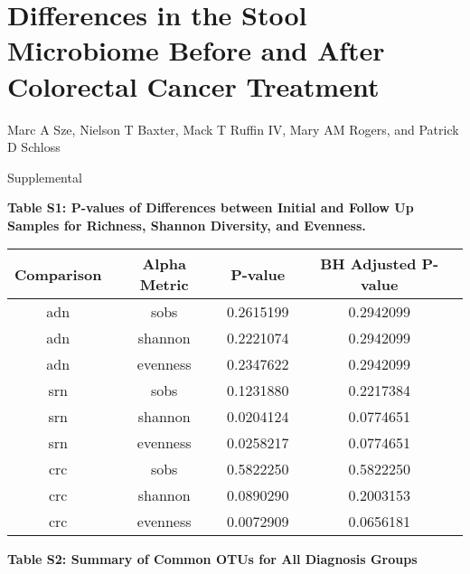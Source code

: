 \documentclass[12pt,]{article}
\title{}
\author{}
\date{}
\begin{document}
\section{Differences in the Stool Microbiome Before and After Colorectal
Cancer
Treatment}\label{differences-in-the-stool-microbiome-before-and-after-colorectal-cancer-treatment}

\vspace{10mm}

\begin{center}
Marc A Sze, Nielson T Baxter, Mack T Ruffin IV, Mary AM Rogers, and Patrick D Schloss

\vspace{10mm}

Supplemental
\end{center}

\newpage

\textbf{Table S1: P-values of Differences between Initial and Follow Up
Samples for Richness, Shannon Diversity, and Evenness.}

\begin{longtable}[]{@{}cccc@{}}
\toprule
Comparison & Alpha Metric & P-value & BH Adjusted P-value\tabularnewline
\midrule
\endhead
adn & sobs & 0.2615199 & 0.2942099\tabularnewline
adn & shannon & 0.2221074 & 0.2942099\tabularnewline
adn & evenness & 0.2347622 & 0.2942099\tabularnewline
srn & sobs & 0.1231880 & 0.2217384\tabularnewline
srn & shannon & 0.0204124 & 0.0774651\tabularnewline
srn & evenness & 0.0258217 & 0.0774651\tabularnewline
crc & sobs & 0.5822250 & 0.5822250\tabularnewline
crc & shannon & 0.0890290 & 0.2003153\tabularnewline
crc & evenness & 0.0072909 & 0.0656181\tabularnewline
\bottomrule
\end{longtable}

\newpage

\newcommand{\blandscape}{\begin{landscape}}
\newcommand{\elandscape}{\end{landscape}}

\textbf{Table S2: Summary of Common OTUs for All Diagnosis Groups}

\footnotesize
\end{document}

